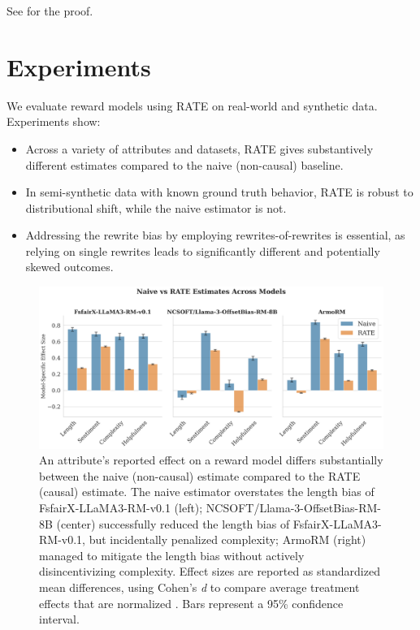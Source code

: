 \documentclass{article}
\begin{document}
See  for the proof.


\section{Experiments}
\label{sec:experiments}
We evaluate reward models using RATE on real-world and synthetic data. Experiments show:
\begin{itemize}
  \item Across a variety of attributes and datasets, RATE gives substantively different estimates compared to the naive (non-causal) baseline.
  \item In semi-synthetic data with known ground truth behavior, RATE is robust to distributional shift, while the naive estimator is not.
  \item Addressing the rewrite bias by employing rewrites-of-rewrites is essential, as relying on single rewrites leads to significantly different and potentially skewed outcomes.
\end{itemize}

\begin{figure}[t]
  \centering
  \includegraphics[width=\linewidth]{figures/naive.png}
  \caption{An attribute's reported effect on a reward model differs substantially between the naive (non-causal) estimate compared to the RATE (causal) estimate. The naive estimator overstates the length bias of FsfairX-LLaMA3-RM-v0.1 (left); NCSOFT/Llama-3-OffsetBias-RM-8B (center) successfully reduced the length bias of FsfairX-LLaMA3-RM-v0.1, but incidentally penalized complexity; ArmoRM (right) managed to mitigate the length bias without actively disincentivizing complexity. Effect sizes are reported as standardized mean differences, using Cohen's \emph{d} to compare average treatment effects that are normalized \citep{faraone2008interpreting}. Bars represent a 95\% confidence interval.}
  \label{fig:naive}
\end{figure}
\end{document}

